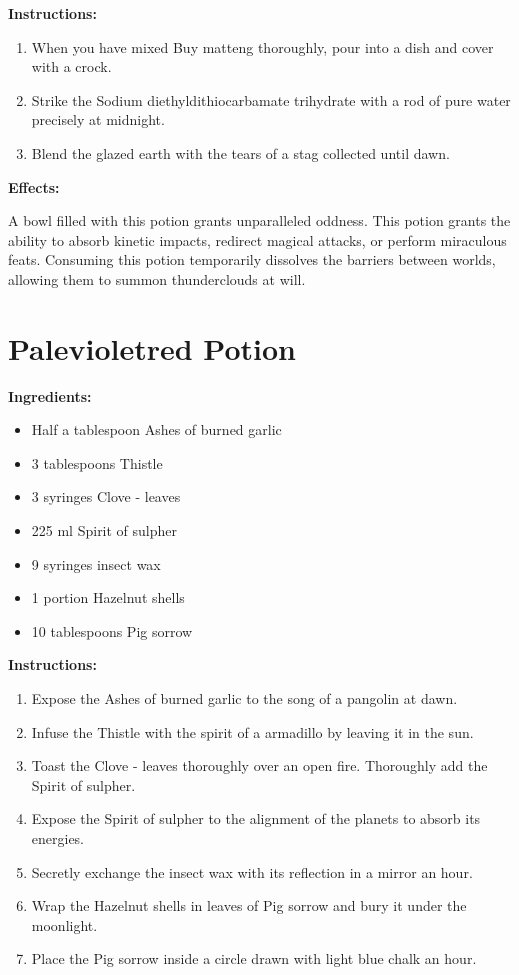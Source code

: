 \documentclass{article}
\begin{document}
\textbf{Instructions:}

\begin{enumerate}
  \item When you have mixed Buy matteng thoroughly, pour into a dish and cover with a crock.
  \item Strike the Sodium diethyldithiocarbamate trihydrate with a rod of pure water precisely at midnight.
  \item Blend the glazed earth with the tears of a stag collected until dawn.
\end{enumerate}

\textbf{Effects:}

A bowl filled with this potion grants unparalleled oddness. This potion grants the ability to absorb kinetic impacts, redirect magical attacks, or perform miraculous feats. Consuming this potion temporarily dissolves the barriers between worlds, allowing them to summon thunderclouds at will.

\newpage
\section*{Palevioletred Potion}

\textbf{Ingredients:}

\begin{itemize}
  \item Half a tablespoon Ashes of burned garlic
  \item 3 tablespoons Thistle
  \item 3 syringes Clove - leaves
  \item 225 ml Spirit of sulpher
  \item 9 syringes insect wax
  \item 1 portion Hazelnut shells
  \item 10 tablespoons Pig sorrow
\end{itemize}

\textbf{Instructions:}

\begin{enumerate}
  \item Expose the Ashes of burned garlic to the song of a pangolin at dawn.
  \item Infuse the Thistle with the spirit of a armadillo by leaving it in the sun.
  \item Toast the Clove - leaves thoroughly over an open fire. Thoroughly add the Spirit of sulpher.
  \item Expose the Spirit of sulpher to the alignment of the planets to absorb its energies.
  \item Secretly exchange the insect wax with its reflection in a mirror an hour.
  \item Wrap the Hazelnut shells in leaves of Pig sorrow and bury it under the moonlight.
  \item Place the Pig sorrow inside a circle drawn with light blue chalk an hour.
\end{enumerate}
\end{document}
